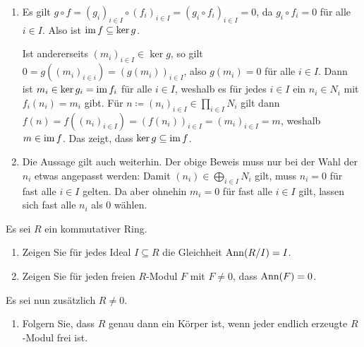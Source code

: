 \begin{solution}
  \begin{enumerate}
    \item
      Es gilt $g \circ f = (g_i)_{i \in I} \circ (f_i)_{i \in I} = (g_i \circ f_i)_{i \in I} = 0$, da $g_i \circ f_i = 0$ für alle $i \in I$.
      Also ist $\operatorname{im} f \subseteq \ker g$.
      
      Ist andererseits $(m_i)_{i \in I} \in \ker g$, so gilt $0 = g((m_i)_{i \in i}) = (g(m_i))_{i \in I}$, also $g(m_i) = 0$ für alle $i \in I$.
      Dann ist $m_i \in \ker g_i = \operatorname{im} f_i$ für alle $i \in I$, weshalb es für jedes $i \in I$ ein $n_i \in N_i$ mit $f_i(n_i) = m_i$ gibt.
      Für $n \coloneqq (n_i)_{i \in I} \in \prod_{i \in I} N_i$ gilt dann $f(n) = f((n_i)_{i \in I}) = (f(n_i))_{i \in I} = (m_i)_{i \in I} = m$, weshalb $m \in \operatorname{im} f$.
      Das zeigt, dass $\ker g \subseteq \operatorname{im} f$.
    \item
      Die Aussage gilt auch weiterhin.
      Der obige Beweis muss nur bei der Wahl der $n_i$ etwas angepasst werden:
      Damit $(n_i) \in \bigoplus_{i \in I} N_i$ gilt, muss $n_i = 0$ für fast alle $i \in I$ gelten.
      Da aber ohnehin $m_i = 0$ für fast alle $i \in I$ gilt, lassen sich fast alle $n_i$ als $0$ wählen.
  \end{enumerate}
\end{solution}


\begin{question}
  \label{question: annihilators of quotients}
  Es sei $R$ ein kommutativer Ring.
  \begin{enumerate}
    \item
      Zeigen Sie für jedes Ideal $I \subseteq R$ die Gleichheit $\operatorname{Ann}(R/I) = I$.
    \item
      Zeigen Sie für jeden freien $R$-Modul $F$ mit $F \neq 0$, dass $\operatorname{Ann}(F) = 0$.
  \end{enumerate}
  Es sei nun zusätzlich $R \neq 0$.
  \begin{enumerate}[resume]
    \item
      Folgern Sie, dass $R$ genau dann ein Körper ist, wenn jeder endlich erzeugte $R$-Modul frei ist.
  \end{enumerate}
\end{question}


